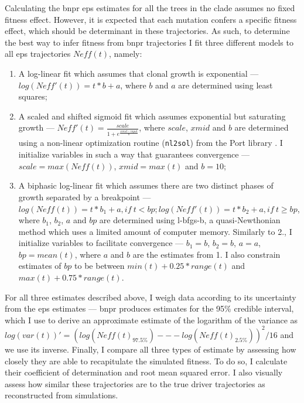 Calculating the \ac{bnpr} \ac{eps} estimates for all the trees in the clade assumes no fixed fitness effect. However, it is expected that each mutation confers a specific fitness effect, which should be determinant in these trajectories. As such, to determine the best way to infer fitness from \ac{bnpr} trajectories I fit three different models to all \ac{eps} trajectories $Neff(t)$, namely:

\begin{enumerate}
    \item A log-linear fit which assumes that clonal growth is exponential --- $log(Neff'(t)) = t * b + a$, where $b$ and $a$ are determined using least squares;
    \item A scaled and shifted sigmoid fit which assumes exponential but saturating growth --- $Neff'(t) = \frac{scale}{1+e^{\frac{xmid-input}{b}}}$, where $scale$, $xmid$ and $b$ are determined using a non-linear optimization routine (\texttt{nl2sol}) from the Port library \cite{noauthor_undated-gs}. I initialize variables in such a way that guarantees convergence --- $scale=max(Neff(t))$, $xmid=max(t)$ and $b=10$;
    \item A biphasic log-linear fit which assumes there are two distinct phases of growth separated by a breakpoint --- $log(Neff(t)) = t * b_1 + a, if\ t < bp; log(Neff'(t)) = t * b_2 + a, if\ t \geq bp$, where $b_1$, $b_2$, $a$ and $bp$ are determined using \ac{l-bfgs-b}, a quasi-Newthonian method which uses a limited amount of computer memory. Similarly to 2., I initialize variables to facilitate convergence --- $b_1=b$, $b_2=b$, $a=a$, $bp=mean(t)$, where $a$ and $b$ are the estimates from 1. I also constrain estimates of $bp$ to be between $min(t) + 0.25*range(t)$ and $max(t) + 0.75 * range(t)$.
\end{enumerate}

For all three estimates described above, I weigh data according to its uncertainty from the \ac{eps} estimates --- \ac{bnpr} produces estimates for the 95\% credible interval, which I use to derive an approximate estimate of the logarithm of the variance as $log(var(t))' = (log(Neff(t)_{97.5\%}) --- log(Neff(t)_{2.5\%}))^2/16$ and we use its inverse. Finally, I compare all three types of estimate by assessing how closely they are able to recapitulate the simulated fitness. To do so, I calculate their coefficient of determination and root mean squared error. I also visually assess how similar these trajectories are to the true driver trajectories as reconstructed from simulations.

